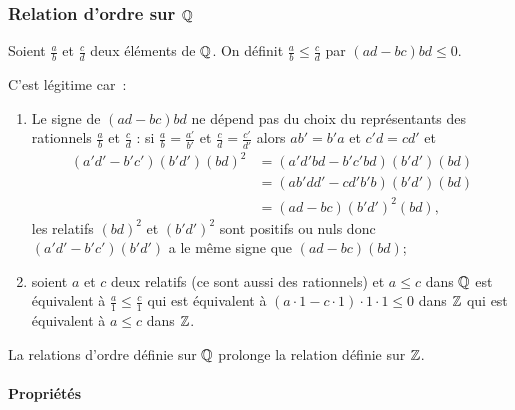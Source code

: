 \subsubsection{Relation d'ordre sur $\mathbb{Q}$}

\begin{defdef}
  Soient $\frac{a}{b}$ et $\frac{c}{d}$ deux éléments de $\mathbb{Q}$. On définit $\frac{a}{b} \leq \frac{c}{d}$ par $(ad-bc)bd \leq 0$.
\end{defdef}

C'est légitime car~:
\begin{enumerate}
\item Le signe de $(ad-bc)bd$ ne dépend pas du choix du représentants des rationnels $\frac{a}{b}$ et $\frac{c}{d}$ : si $\frac{a}{b}=\frac{a'}{b'}$ et $\frac{c}{d} = \frac{c'}{d'}$ alors $ab'=b'a$ et $c'd=cd'$ et
  \begin{align}
    (a'd'-b'c')(b'd')(bd)^2&=(a'd'bd -b'c'bd)(b'd')(bd)\\
    &=(ab'dd'-cd'b'b)(b'd')(bd)\\
    &=(ad-bc)(b'd')^2(bd),
  \end{align}
  les relatifs $(bd)^2$ et $(b'd')^2$ sont positifs ou nuls donc $(a'd'-b'c')(b'd')$ a le même signe que $(ad-bc)(bd)$;
\item soient $a$ et $c$ deux relatifs (ce sont aussi des rationnels) et $a \leq c$ dans $\mathbb{Q}$ est équivalent à $\frac{a}{1} \leq \frac{c}{1}$ qui est équivalent à $(a\cdot 1-c \cdot 1)\cdot 1 \cdot 1 \leq 0$ dans $\mathbb{Z}$ qui est équivalent à $a \leq c$ dans $\mathbb{Z}$.
\end{enumerate}

La relations d'ordre définie sur $\mathbb{Q}$ prolonge la relation définie sur $\mathbb{Z}$.

\paragraph{Propriétés}


